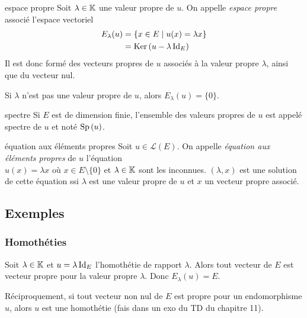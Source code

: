 \begin{definition}{espace propre}{}
    Soit $\lambda \in \mathbb{K}$ une valeur propre de $u$. On appelle \emph{espace propre} 
    associé l'espace vectoriel 
    \begin{align} E_\lambda(u) & = \{ x \in E \mid u(x) = \lambda x \} \\
                        & = \operatorname{Ker} \, (u - \lambda \operatorname{Id}_E) 
    \end{align}
    Il est donc formé des vecteurs propres de $u$ associés à la valeur propre $\lambda$,
    ainsi que du vecteur nul.
\end{definition}

\begin{remarque}
    Si $\lambda$ n'est pas une valeur propre de $u$, alors $E_\lambda(u) = \{0\}$.
\end{remarque}

\begin{definition}{spectre}{}
    Si $E$ est de dimension finie, l'ensemble des valeurs propres de $u$ est appelé spectre de $u$ 
    et noté $\operatorname{Sp} \,(u)$.
\end{definition}

\begin{definition}{équation aux éléments propres}{}
    Soit $u \in \mathscr L(E)$. On appelle \emph{équation aux éléments propres} de $u$
    l'équation \\ 
    $u(x) = \lambda x$ où $x \in E \setminus \{0\}$ et $\lambda \in \mathbb{K}$ sont 
    les inconnues. $(\lambda, x)$ est une solution de cette équation ssi $\lambda$ est une valeur propre 
    de $u$ et $x$ un vecteur propre associé.
\end{definition}

\subsection{Exemples}
\subsubsection{Homothéties}

\begin{exemple}
    Soit $\lambda \in \mathbb{K}$ et $u = \lambda \operatorname{Id}_E$ l'homothétie de rapport $\lambda$. 
    Alors tout vecteur de $E$ est vecteur propre pour la valeur propre $\lambda$.
    Donc $E_\lambda(u) = E$.

    \avspace Réciproquement, si tout vecteur non nul de $E$ est propre pour un endomorphisme $u$, 
    alors $u$ est une homothétie (fais dans un exo du TD du chapitre 11).
\end{exemple}

